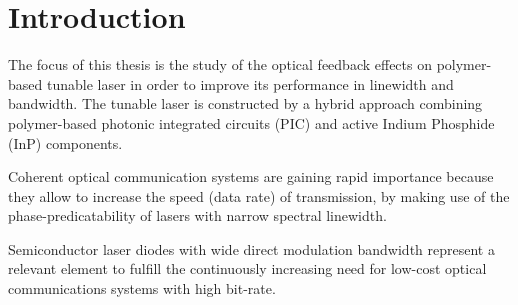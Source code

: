 \chapter{Introduction}
\label{ch:Introduction}
The focus of this thesis is the study of the optical feedback effects on polymer-based tunable laser in order to improve its performance in linewidth and bandwidth. The tunable laser is constructed by a hybrid approach combining polymer-based photonic integrated circuits (PIC) and active Indium Phosphide (InP) components.


Coherent optical communication systems are gaining rapid importance because they allow to increase the speed (data rate) of transmission, by making use of the phase-predicatability of lasers with narrow spectral linewidth.

Semiconductor laser diodes with wide direct modulation bandwidth represent a relevant element to fulfill the continuously increasing need for low-cost optical communications systems with high bit-rate.


